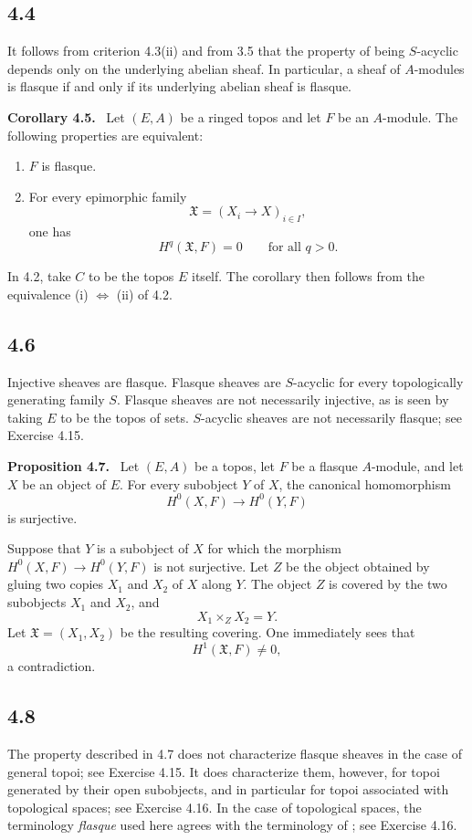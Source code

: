\documentclass[11pt]{article}
\newenvironment{statement}[1]{\par\medskip\noindent\textbf{#1.}\ }{\par\medskip}
\begin{document}
\subsection*{4.4}
It follows from criterion 4.3(ii) and from 3.5 that the property of being $S$-acyclic depends only on the underlying abelian sheaf. In particular, a sheaf of $A$-modules is flasque if and only if its underlying abelian sheaf is flasque.

\begin{statement}{Corollary 4.5}
Let $(E,A)$ be a ringed topos and let $F$ be an $A$-module. The following properties are equivalent:
\begin{enumerate}[label=(\roman*)]
\item $F$ is flasque.
\item For every epimorphic family
\[
\mathfrak X=(X_i\to X)_{i\in I},
\]
one has
\[
H^q(\mathfrak X,F)=0\qquad\text{for all }q>0.
\]
\end{enumerate}
\end{statement}

In 4.2, take $C$ to be the topos $E$ itself. The corollary then follows from the equivalence (i) $\Leftrightarrow$ (ii) of 4.2.

\subsection*{4.6}
Injective sheaves are flasque. Flasque sheaves are $S$-acyclic for every topologically generating family $S$. Flasque sheaves are not necessarily injective, as is seen by taking $E$ to be the topos of sets. $S$-acyclic sheaves are not necessarily flasque; see Exercise 4.15.

\begin{statement}{Proposition 4.7}
Let $(E,A)$ be a topos, let $F$ be a flasque $A$-module, and let $X$ be an object of $E$. For every subobject $Y$ of $X$, the canonical homomorphism
\[
H^0(X,F)\longrightarrow H^0(Y,F)
\]
is surjective.
\end{statement}

Suppose that $Y$ is a subobject of $X$ for which the morphism $H^0(X,F)\to H^0(Y,F)$ is not surjective. Let $Z$ be the object obtained by gluing two copies $X_1$ and $X_2$ of $X$ along $Y$. The object $Z$ is covered by the two subobjects $X_1$ and $X_2$, and
\[
X_1\times_Z X_2=Y.
\]
Let $\mathfrak X=(X_1,X_2)$ be the resulting covering. One immediately sees that
\[
H^1(\mathfrak X,F)\neq0,
\]
a contradiction.

\subsection*{4.8}
The property described in 4.7 does not characterize flasque sheaves in the case of general topoi; see Exercise 4.15. It does characterize them, however, for topoi generated by their open subobjects, and in particular for topoi associated with topological spaces; see Exercise 4.16. In the case of topological spaces, the terminology \emph{flasque} used here agrees with the terminology of \cite{7}; see Exercise 4.16.
\end{document}
